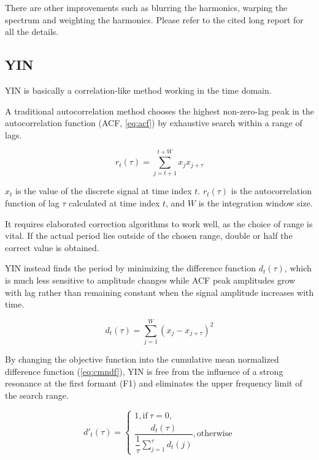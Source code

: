 \documentclass[11pt,a4paper]{report}
\begin{document}
There are other improvements such as blurring the harmonics, warping the spectrum and weighting the harmonics.
Please refer to the cited long report \parencite{camacho2007swipe} for all the details.

\subsection{YIN}

YIN is basically a correlation-like method working in the time domain.

A traditional autocorrelation method chooses the highest non-zero-lag peak in the autocorrelation function (ACF, \autoref{eq:acf}) by exhaustive search within a range of lags.

\begin{equation} \label{eq:acf}
  r_t (\tau) = \sum_{j=t+1}^{t+W} x_j x_{j+\tau}
\end{equation}

\(x_t\) is the value of the discrete signal at time index \(t\).
\(r_t (\tau)\) is the autocorrelation function of lag \(\tau\) calculated at time index \(t\), and \(W\) is the integration window size.

It requires elaborated correction algorithms to work well, as the choice of range is vital.
If the actual period lies outside of the chosen range, double or half the correct value is obtained.

YIN instead finds the period by minimizing the difference function \(d_t (\tau)\), which is much less sensitive to amplitude changes while ACF peak amplitudes grow with lag rather than remaining constant when the signal amplitude increases with time.

\begin{equation}
  d_t (\tau) = \sum_{j=1}^W (x_j - x_{j+\tau})^2
\end{equation}

By changing the objective function into the cumulative mean normalized difference function (\autoref{eq:cmndf}), YIN is free from the influence of a strong resonance at the first formant (F1) and eliminates the upper frequency limit of the search range.

\begin{equation} \label{eq:cmndf}
d'_t (\tau) = \begin{cases}
1, \text{if}\ \tau = 0, \\
\dfrac{d_t (\tau)}{\dfrac{1}{\tau} \sum_{j=1}^{\tau} d_t (j)}, \text{otherwise}
\end{cases}
\end{equation}
\end{document}
